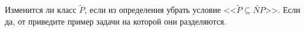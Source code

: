 Изменится ли класс $\widetilde{P}$, если из определения убрать условие
<<$\widetilde{P} \subseteq \widetilde{NP}$>>. Если да, от приведите пример задачи на которой они
разделяются.
